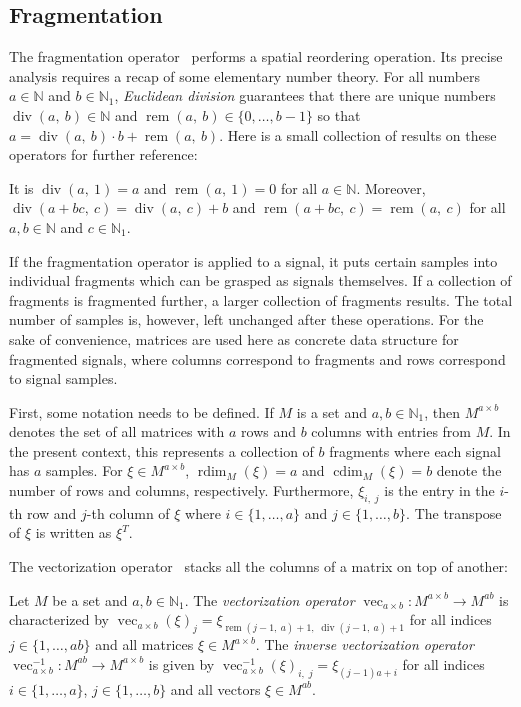 \documentclass[journal]{IEEEtran}
\newcommand{\N}{\mathbb{N}}
\newcommand{\discint}[2]{\{#1,\dotsc,#2\}}
\newcommand{\inint}[2]{\in\discint{#1}{#2}}
\newcommand{\transp}{^T}
\DeclareMathOperator{\vect}{vec}
\DeclareMathOperator{\rdim}{rdim}
\DeclareMathOperator{\cdim}{cdim}
\renewcommand{\div}[2]{\operatorname{div}(#1,\ #2)}
\newcommand{\rem}[2]{\operatorname{rem}(#1,\ #2)}
\begin{document}
\subsection{Fragmentation}
The fragmentation operator~\cite{Giusti2013} performs a spatial reordering operation.
Its precise analysis requires a recap of some elementary number theory.
For all numbers $a\in\N$ and $b\in\N_1$, \emph{Euclidean division} guarantees that there are unique numbers $\div{a}{b}\in\N$ and $\rem{a}{b}\inint{0}{b - 1}$ so that $a = \div{a}{b}\cdot b + \rem{a}{b}$.
Here is a small collection of results on these operators for further reference:
\begin{proposition}
\label{prop:number-theory}
It is $\div{a}{1} = a$ and $\rem{a}{1} = 0$ for all $a\in\N$.
Moreover, $\div{a + bc}{c} = \div{a}{c} + b$ and $\rem{a + bc}{c} = \rem{a}{c}$ for all $a,b\in\N$ and $c\in\N_1$.
\end{proposition}

If the fragmentation operator is applied to a signal, it puts certain samples into individual fragments which can be grasped as signals themselves.
If a collection of fragments is fragmented further, a larger collection of fragments results.
The total number of samples is, however, left unchanged after these operations.
For the sake of convenience, matrices are used here as concrete data structure for fragmented signals, where columns correspond to fragments and rows correspond to signal samples.

First, some notation needs to be defined.
If $M$ is a set and $a,b\in\N_1$, then $M^{a\times b}$ denotes the set of all matrices with $a$ rows and $b$ columns with entries from $M$.
In the present context, this represents a collection of $b$ fragments where each signal has $a$ samples.
For $\xi\in M^{a\times b}$, $\rdim_M(\xi) = a$ and $\cdim_M(\xi) = b$ denote the number of rows and columns, respectively.
Furthermore, $\xi_{i,\; j}$ is the entry in the $i$-th row and $j$-th column of $\xi$ where $i\inint{1}{a}$ and $j\inint{1}{b}$.
The transpose of $\xi$ is written as $\xi\transp$.

The vectorization operator~\cite{Neudecker1969} stacks all the columns of a matrix on top of another:
\begin{definition}
\label{def:vectorization}
Let $M$ be a set and $a,b\in\N_1$.
The \emph{vectorization operator} $\vect_{a\times b}\colon M^{a\times b}\to M^{ab}$ is characterized by $\vect_{a\times b}(\xi)_j = \xi_{\rem{j - 1}{a} + 1,\;\div{j - 1}{a} + 1}$ for all indices $j\inint{1}{ab}$ and all matrices $\xi\in M^{a\times b}$.
The \emph{inverse vectorization operator} $\vect_{a\times b}^{-1}\colon M^{ab}\to M^{a\times b}$ is given by $\vect_{a\times b}^{-1}(\xi)_{i,\;j} = \xi_{(j - 1)a + i}$ for all indices $i\inint{1}{a}$, $j\inint{1}{b}$ and all vectors $\xi\in M^{ab}$.
\end{definition}
\end{document}
